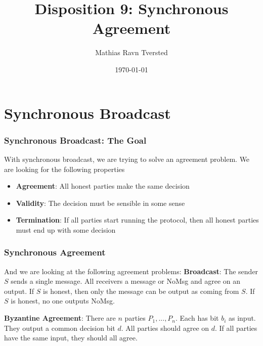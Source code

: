 
\title{Disposition 9: Synchronous Agreement}   
\author{Mathias Ravn Tversted} 
\date{\today} 












\frame{\titlepage} 



\section{Synchronous Broadcast}
    \begin{frame}
        \frametitle{Synchronous Broadcast: The Goal}
            With synchronous broadcast, we are trying to solve an agreement problem. We are looking for the following properties
            \begin{itemize}
                \item \textbf{Agreement}: All honest parties make the same decision
                \item \textbf{Validity}: The decision must be sensible in some sense
                \item \textbf{Termination}: If all parties start running the protocol, then all honest parties must end up with some decision
            \end{itemize}
    \end{frame}
\begin{frame}
    \frametitle{Synchronous Agreement}  
        And we are looking at the following agreement problems:
        \textbf{Broadcast}: The sender $S$ sends a single message. All receivers a message or NoMsg and agree on an output. If $S$ is honest, then only the message can be output as coming from $S$. If $S$ is honest, no one outputs NoMsg. 
        
        \textbf{Byzantine Agreement}: There are $n$ parties $P_1, ..., P_n$. Each has bit $b_i$ as input. They output a common decision bit $d$. All parties should agree on $d$. If all parties have the same input, they should all agree. 
\end{frame}


